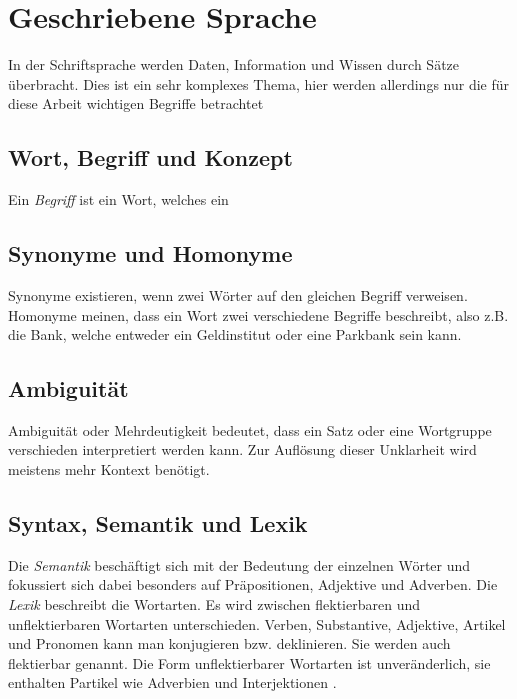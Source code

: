 \section{Geschriebene Sprache}

In der Schriftsprache werden Daten, Information und Wissen durch Sätze überbracht.
Dies ist ein sehr komplexes Thema, hier werden allerdings nur die für diese Arbeit wichtigen Begriffe betrachtet

\subsection{Wort, Begriff und Konzept}

Ein \emph{Begriff} ist ein Wort, welches ein

\subsection{Synonyme und Homonyme}

Synonyme existieren, wenn zwei Wörter auf den gleichen Begriff verweisen.
Homonyme meinen, dass ein Wort zwei verschiedene Begriffe beschreibt, also z.B. die Bank, welche entweder ein Geldinstitut oder eine Parkbank sein kann.

\subsection{Ambiguität}

Ambiguität oder Mehrdeutigkeit bedeutet, dass ein Satz oder eine Wortgruppe verschieden interpretiert werden kann.
Zur Auflösung dieser Unklarheit wird meistens mehr Kontext benötigt.

\subsection{Syntax, Semantik und Lexik}

Die \emph{Semantik} beschäftigt sich mit der Bedeutung der einzelnen Wörter und fokussiert sich dabei besonders auf Präpositionen, Adjektive und Adverben.
Die \emph{Lexik} beschreibt die Wortarten.
Es wird zwischen flektierbaren und unflektierbaren Wortarten unterschieden.
Verben, Substantive, Adjektive, Artikel und Pronomen kann man konjugieren bzw. deklinieren.
Sie werden auch flektierbar genannt.
Die Form unflektierbarer Wortarten ist unveränderlich, sie enthalten Partikel wie Adverbien und Interjektionen \citep[S.~505]{deutschbuch}.

